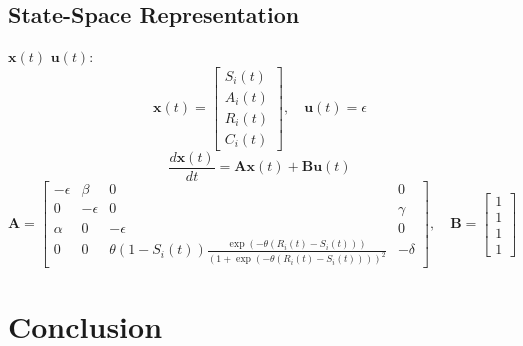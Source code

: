 \documentclass[english, a4paper, 11pt]{article}
\begin{document}
\subsection*{State-Space Representation}
 $\mathbf{x}(t)$  $\mathbf{u}(t)$:
\begin{equation}
    \mathbf{x}(t) = \begin{bmatrix} S_i(t) \\ A_i(t) \\ R_i(t) \\ C_i(t) \end{bmatrix}, \quad \mathbf{u}(t) = \epsilon
\end{equation}
\begin{equation}
    \frac{d\mathbf{x}(t)}{dt} = \mathbf{A} \mathbf{x}(t) + \mathbf{B} \mathbf{u}(t)
\end{equation}
\begin{equation}
    \mathbf{A} = \begin{bmatrix}
        -\epsilon & \beta     & 0                                                                                                   & 0       \\
        0         & -\epsilon & 0                                                                                                   & \gamma  \\
        \alpha    & 0         & -\epsilon                                                                                           & 0       \\
        0         & 0         & \theta (1 - S_i(t)) \frac{\exp(-\theta (R_i(t) - S_i(t)))}{(1 + \exp(-\theta (R_i(t) - S_i(t))))^2} & -\delta
    \end{bmatrix}, \quad \mathbf{B} = \begin{bmatrix} 1 \\ 1 \\ 1 \\ 1 \end{bmatrix}
\end{equation}


\section{Conclusion}


\printbibliography
\end{document}
